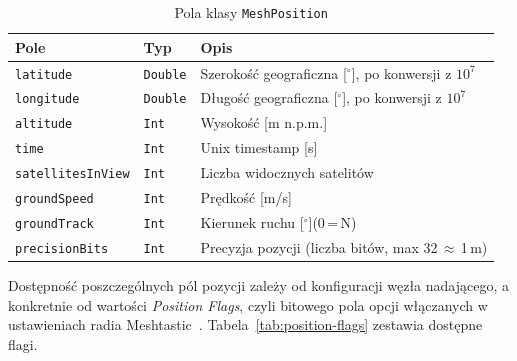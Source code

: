 \begin{table}[!h]
    \caption{Pola klasy \texttt{MeshPosition}}
    \label{tab:meshposition}
    \centering
    \begin{tabular}{|l|l|p{6.5cm}|}
        \hline
        \textbf{Pole} & \textbf{Typ} & \textbf{Opis} \\
        \hline
        \texttt{latitude}        & \texttt{Double} & Szerokość geograficzna [${}^\circ$], po konwersji z $10^7$ \\
        \texttt{longitude}       & \texttt{Double} & Długość geograficzna [${}^\circ$], po konwersji z $10^7$ \\
        \texttt{altitude}        & \texttt{Int}    & Wysokość [m n.p.m.] \\
        \texttt{time}            & \texttt{Int}    & Unix timestamp [s] \\
        \texttt{satellitesInView}& \texttt{Int}    & Liczba widocznych satelitów \\
        \texttt{groundSpeed}     & \texttt{Int}    & Prędkość [m/s] \\
        \texttt{groundTrack}     & \texttt{Int}    & Kierunek ruchu [${}^\circ$](0\,=\,N) \\
        \texttt{precisionBits}   & \texttt{Int}    & Precyzja pozycji (liczba bitów, max 32\,$\approx$\,1\,m) \\
        \hline
    \end{tabular}
\end{table}

Dostępność poszczególnych pól pozycji zależy od konfiguracji węzła nadającego, a konkretnie
od wartości \textit{Position Flags}, czyli bitowego pola opcji włączanych w ustawieniach
radia Meshtastic~\cite{meshtasticPositionConfigDocs}.
Tabela~\ref{tab:position-flags} zestawia dostępne flagi.

